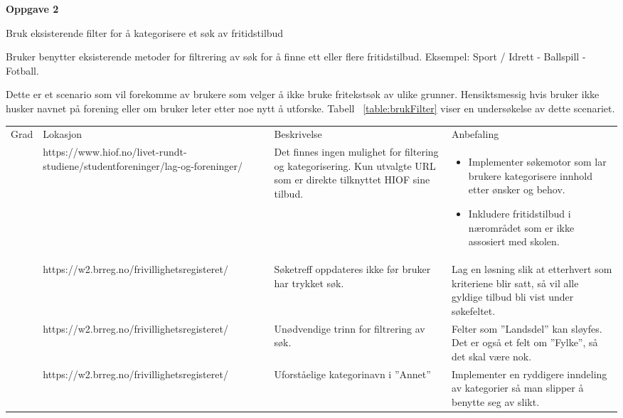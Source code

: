 \textbf{Oppgave 2} \par
Bruk eksisterende filter for å kategorisere et søk av fritidstilbud


Bruker benytter eksisterende metoder for filtrering av søk for å finne ett eller flere fritidstilbud.\newline
Eksempel: Sport / Idrett - Ballspill - Fotball.
\par
Dette er et scenario som vil forekomme av brukere som velger å ikke bruke fritekstsøk av ulike grunner. Hensiktsmessig hvis bruker ikke husker navnet på forening eller om bruker leter etter noe nytt å utforske. Tabell ~\ref{table:brukFilter} viser en undersøkelse av dette scenariet.

\begin{center}
\begin{table}[H]
\begin{tabular}{ | m{0.7cm} | m{4cm}| m{4cm} | m{4cm} | } 
 \hline
 \centering Grad & Lokasjon & Beskrivelse & Anbefaling \\
 
 \centering 4 & \tiny https://www.hiof.no/livet-rundt-studiene/studentforeninger/lag-og-foreninger/ & \tiny Det finnes ingen mulighet for filtering og kategorisering. Kun utvalgte URL som er direkte tilknyttet HIOF sine tilbud. & \tiny \begin{itemize}
    \item Implementer søkemotor som lar brukere kategorisere innhold etter ønsker og behov.
\item Inkludere fritidstilbud i nærområdet som er ikke assosiert med skolen.\end{itemize}  \\

 \centering 2 & \tiny https://w2.brreg.no/frivillighetsregisteret/ & \tiny Søketreff oppdateres ikke før bruker har trykket søk. & \tiny Lag en løsning slik at etterhvert som kriteriene blir satt, så vil alle gyldige tilbud bli vist under søkefeltet.  \\
 
 \centering 3 & \tiny https://w2.brreg.no/frivillighetsregisteret/ & \tiny Unødvendige trinn for filtrering av søk. & \tiny Felter som ''Landsdel'' kan sløyfes. Det er også et felt om ''Fylke'', så det skal være nok. \\
 
 \centering 2 & \tiny https://w2.brreg.no/frivillighetsregisteret/ & \tiny Uforståelige kategorinavn i ''Annet'' & \tiny Implementer en ryddigere inndeling av kategorier så man slipper å benytte seg av slikt. \\
 

\end{tabular}
\end{table}
\end{center}
